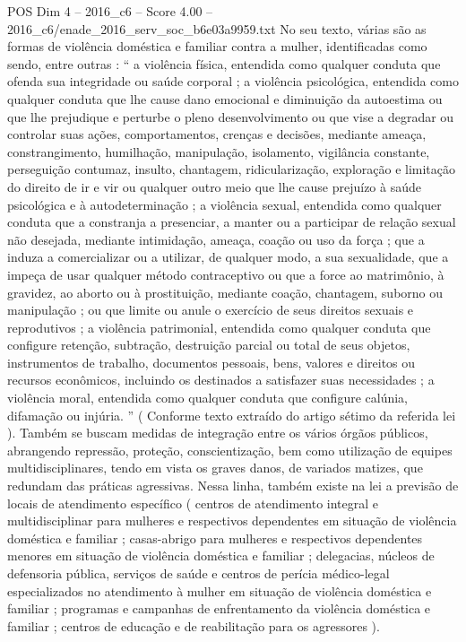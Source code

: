 \begin{textsample}{POS Dim 4 – 2016\_c6 – Score 4.00 – 2016\_c6/enade\_2016\_serv\_soc\_b6e03a9959.txt}
No seu texto, várias são as formas de violência doméstica e familiar contra a mulher, identificadas como sendo, entre outras : “ a violência física, entendida como qualquer conduta que ofenda sua integridade ou saúde corporal ; a violência psicológica, entendida como qualquer conduta que lhe cause dano emocional e diminuição da autoestima ou que lhe prejudique e perturbe o pleno desenvolvimento ou que vise a degradar ou controlar suas ações, comportamentos, crenças e decisões, mediante ameaça, constrangimento, humilhação, manipulação, isolamento, vigilância constante, perseguição contumaz, insulto, chantagem, ridicularização, exploração e limitação do direito de ir e vir ou qualquer outro meio que lhe cause prejuízo à saúde psicológica e à autodeterminação ; a violência sexual, entendida como qualquer conduta que a constranja a presenciar, a manter ou a participar de relação sexual não desejada, mediante intimidação, ameaça, coação ou uso da força ; que a induza a comercializar ou a utilizar, de qualquer modo, a sua sexualidade, que a impeça de usar qualquer método contraceptivo ou que a force ao matrimônio, à gravidez, ao aborto ou à prostituição, mediante coação, chantagem, suborno ou manipulação ; ou que limite ou anule o exercício de seus direitos sexuais e reprodutivos ; a violência patrimonial, entendida como qualquer conduta que configure retenção, subtração, destruição parcial ou total de seus objetos, instrumentos de trabalho, documentos pessoais, bens, valores e direitos ou recursos econômicos, incluindo os destinados a satisfazer suas necessidades ; a violência moral, entendida como qualquer conduta que configure calúnia, difamação ou injúria. ” ( Conforme texto extraído do artigo sétimo da referida lei ).
Também se buscam medidas de integração entre os vários órgãos públicos, abrangendo repressão, proteção, conscientização, bem como utilização de equipes multidisciplinares, tendo em vista os graves danos, de variados matizes, que redundam das práticas agressivas.
Nessa linha, também existe na lei a previsão de locais de atendimento específico ( centros de atendimento integral e multidisciplinar para mulheres e respectivos dependentes em situação de violência doméstica e familiar ; casas-abrigo para mulheres e respectivos dependentes menores em situação de violência doméstica e familiar ; delegacias, núcleos de defensoria pública, serviços de saúde e centros de perícia médico-legal especializados no atendimento à mulher em situação de violência doméstica e familiar ; programas e campanhas de enfrentamento da violência doméstica e familiar ; centros de educação e de reabilitação para os agressores ).

\end{textsample}
